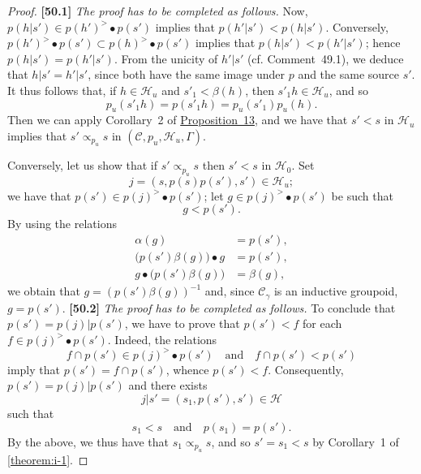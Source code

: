 \documentclass[a4paper,fleqn]{article}
\theoremstyle{plain}
\theoremstyle{definition}
\newenvironment{longcomm}[1]
  {\noindent\textbf{[#1]}\rmfamily}
  {}
\newcommand{\textand}{\quad\text{and}\quad}
\newcommand{\CC}{\mathcal{C}}
\newcommand{\HH}{\mathcal{H}}
\newcommand{\subs}{\mathrel{\propto}}
\begin{document}
\begin{proof}
\begin{longcomm}{50.1}
    \emph{The proof has to be completed as follows.}
    Now, $p(h|s')\in p(h')^>\bullet p(s')$ implies that $p(h'|s')<p(h|s')$.
    Conversely, $p(h')^>\bullet p(s')\subset p(h)^>\bullet p(s')$ implies that $p(h|s')<p(h'|s')$;
    hence $p(h|s')=p(h'|s')$.
    From the unicity of $h'|s'$ (cf. Comment~49.1), we deduce that $h|s'=h'|s'$, since both have the same image under $p$ and the same source $s'$.
  \end{longcomm}
  It thus follows that, if $h\in\HH_u$ and $s'_1<\beta(h)$, then $s'_1h\in\HH_u$, and so
  \[
    p_u(s'_1h)
    = p(s'_1h)
    = p_u(s'_1)p_u(h).
  \]
  Then we can apply Corollary~2 of \hyperref[proposition:i-13]{Proposition~13}, and we have that $s'<s$ in $\HH_u$ implies that $s'\subs_{p_u}s$ in $(\CC,p_u,\HH_u,\Gamma)$.

  Conversely, let us show that if $s'\subs_{p_u}s$ then $s'<s$ in $\HH_0$.
  Set
  \[
    j
    = (s, p(s)p(s'), s')
    \in \HH_u;
  \]
  we have that $p(s')\in p(j)^>\bullet p(s')$;
  let $g\in p(j)^>\bullet p(s')$ be such that
  \[
    g<p(s').
  \]
  By using the relations
  \[
    \begin{aligned}
      \alpha(g)
      &= p(s'),
    \\\big( p(s')\beta(g) \big)\bullet g
      &= p(s'),
    \\g\bullet\big( p(s')\beta(g) \big)
      &= \beta(g),
    \end{aligned}
  \]
  we obtain that $g=(p(s')\beta(g))^{-1}$ and, since $\CC_\gamma$ is an inductive groupoid, $g=p(s')$.
  \begin{longcomm}{50.2}
    \emph{The proof has to be completed as follows.}
    To conclude that $p(s')=p(j)|p(s')$, we have to prove that $p(s')<f$ for each $f\in p(j)^>\bullet p(s')$.
    Indeed, the relations
    \[
      f\cap p(s')
      \in p(j)^>\bullet p(s')
      \textand
      f\cap p(s')
      < p(s')
    \]
    imply that $p(s')=f\cap p(s')$, whence $p(s')<f$.
  \end{longcomm}
  Consequently, $p(s')=p(j)|p(s')$ and there exists
  \[
    j|s'
    = (s_1,p(s'),s')
    \in\HH
  \]
  such that
  \[
    s_1<s
    \textand
    p(s_1)=p(s').
  \]
  By the above, we thus have that $s_1\subs_{p_u}s$, and so $s'=s_1<s$ by Corollary~1 of \cref{theorem:i-1}.
\end{proof}
\end{document}
